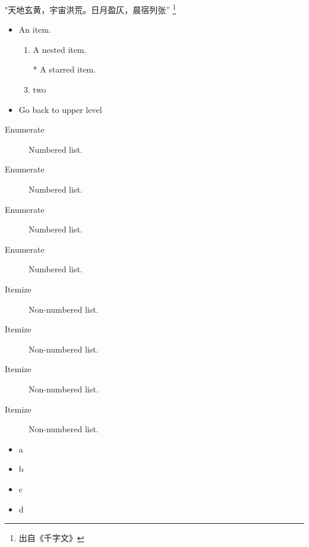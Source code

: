 \documentclass{article}
\begin{document}
	
	"天地玄黄，宇宙洪荒。日月盈仄，晨宿列张'' \footnote{出自《千字文》}
	
	\begin{itemize}
		\item
		 An item.
		\begin{enumerate}
			\item 
			A nested item.
			\item[*] 
			A starred item.
			\item
			two
		\end{enumerate}
		\item 
		Go back to upper level
	\end{itemize}
	
	\begin{description}
	\item[Enumerate] Numbered list.
	\item[Enumerate] Numbered list.
	\item[Enumerate] Numbered list.
	\item[Enumerate] Numbered list.
	\end{description}
	
	\begin{description}
		\item[Itemize] Non-numbered list.
		\item[Itemize] Non-numbered list.
		\item[Itemize] Non-numbered list.
		\item[Itemize] Non-numbered list.
	\end{description}
	
	\begin{itemize}
	\item
	a
	\item
	b
	\item
	c
	\item
	d
	\end{itemize}
	
\end{document}
